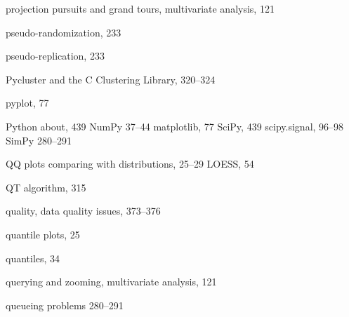 \documentclass{Oreilly5980006}
\def\see#1{{\it See software}}
\begin{document}
\begin{theindex}
  \item projection pursuits and grand tours, multivariate analysis, 121
  \item pseudo-randomization, 233
  \item pseudo-replication, 233
  \item Pycluster and the C Clustering Library, 320--324
  \item pyplot, 77
  \item Python
    \subitem about, 439
  \subitem  NumPy 37--44
    \subitem matplotlib, 77
  \subitem  SciPy, 439
  \subitem  scipy.signal, 96--98
  \subitem  SimPy 280--291

  \indexspace

  \item QQ plots
    \subitem comparing with distributions, 25--29
    \subitem LOESS, 54
  \item QT algorithm, 315
  \item quality, data quality issues, 373--376
  \item quantile plots, 25
  \item quantiles, 34
  \item querying and zooming, multivariate analysis, 121
\item queueing problems 280--291
  \indexspace


\end{theindex}
\end{document}
